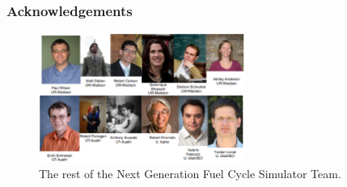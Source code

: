 
\begin{frame}[ctb!]
  \frametitle{Acknowledgements}  
\begin{figure}[htp!]
\begin{center}
\includegraphics[width=0.6\textwidth]{images/ngfcspics.eps}
\end{center}
\caption{The rest of the Next Generation Fuel Cycle Simulator Team.}
\label{fig:ngfcspics}
\end{figure}

\end{frame}

